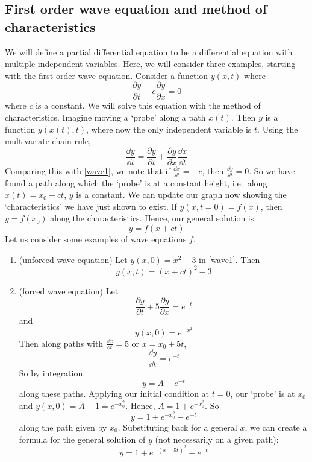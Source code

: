 \subsection{First order wave equation and method of characteristics}
We will define a partial differential equation to be a differential equation with multiple independent variables.
Here, we will consider three examples, starting with the first order wave equation.
Consider a function \(y(x, t)\) where
\begin{equation}\label{wave1}
	\frac{\partial y}{\partial t} - c\frac{\partial y}{\partial x} = 0
\end{equation}
where \(c\) is a constant.
We will solve this equation with the method of characteristics.
Imagine moving a `probe' along a path \(x(t)\).
Then \(y\) is a function \(y(x(t), t)\), where now the only independent variable is \(t\).
Using the multivariate chain rule,
\[
	\frac{\dd{y}}{\dd{t}} = \frac{\partial y}{\partial t} + \frac{\partial y}{\partial x}\frac{\dd{x}}{\dd{t}}
\]
Comparing this with \eqref{wave1}, we note that if \(\frac{\dd{x}}{\dd{t}} = -c\), then \(\frac{\dd{y}}{\dd{t}} = 0\).
So we have found a path along which the `probe' is at a constant height, i.e.\ along \(x(t) = x_0 - ct\), \(y\) is a constant.
We can update our graph now showing the `characteristics' we have just shown to exist.
If \(y(x, t = 0) = f(x)\), then \(y = f(x_0)\) along the characteristics.
Hence, our general solution is
\[
	y = f(x+ct)
\]
Let us consider some examples of wave equations \(f\).
\begin{enumerate}
	\item (unforced wave equation) Let \(y(x,0) = x^2 - 3\) in \eqref{wave1}.
	      Then
	      \[
		      y(x, t) = (x+ct)^2 - 3
	      \]
	\item (forced wave equation) Let
	      \[
		      \frac{\partial y}{\partial t} + 5\frac{\partial y}{\partial x} = e^{-t}
	      \]
	      and
	      \[
		      y(x, 0) = e^{-x^2}
	      \]
	      Then along paths with \(\frac{\dd{x}}{\dd{t}} = 5\) or \(x=x_0 + 5t\),
	      \[
		      \frac{\dd{y}}{\dd{t}} = e^{-t}
	      \]
	      So by integration,
	      \[
		      y = A-e^{-t}
	      \]
	      along these paths.
	      Applying our initial condition at \(t=0\), our `probe' is at \(x_0\) and \(y(x, 0) = A - 1 = e^{-x_0^2}\).
	      Hence, \(A = 1 + e^{-x_0^2}\).
	      So
	      \[
		      y = 1 + e^{-x_0^2} - e^{-t}
	      \]
	      along the path given by \(x_0\).
	      Substituting back for a general \(x\), we can create a formula for the general solution of \(y\) (not necessarily on a given path):
	      \[
		      y = 1 + e^{-(x-5t)^2} - e^{-t}
	      \]
\end{enumerate}
